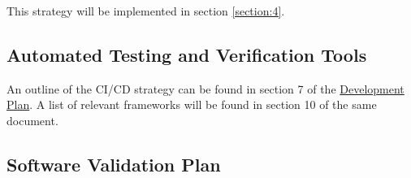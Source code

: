 \documentclass[12pt, titlepage]{article}
\begin{document}
This strategy will be implemented in section \ref{section:4}.

\subsection{Automated Testing and Verification Tools} \label{section:3.6}

An outline of the CI/CD strategy can be found in section 7 of the \href{https://github.com/Inreet-Kaur/capstone/blob/main/docs/DevelopmentPlan/DevelopmentPlan.pdf}{Development Plan}. A list of relevant frameworks will be found in section 10 of the same document.

\subsection{Software Validation Plan} \label{section:3.7}

\end{document}
